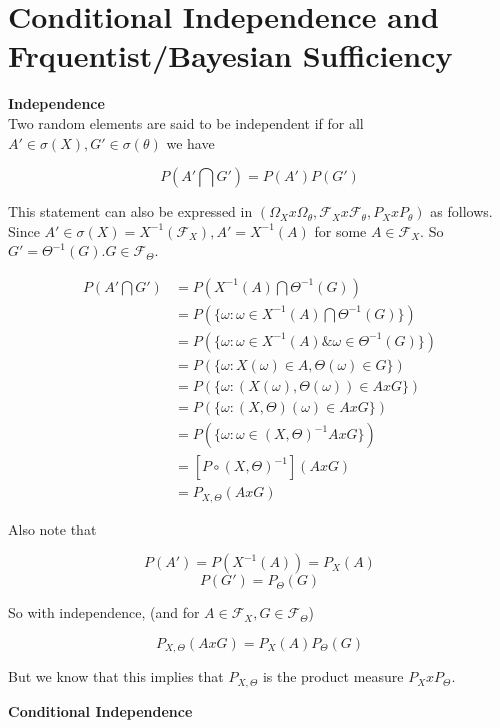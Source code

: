 \documentclass[11pt,fleqn]{book} %
\begin{document}
\section{Conditional Independence and Frquentist/Bayesian Sufficiency}


\textbf{Independence}\\

Two random elements are said to be independent if for all $A' \in \sigma(X), G' \in \sigma(\theta)$ we have

		$$P(A' \bigcap G') = P(A')P(G') $$

This statement can also be expressed in $(\Omega_X x \Omega_\theta, \mathcal{F}_X x \mathcal{F}_\theta, P_X x P_\theta)$ as follows. \\

Since $A' \in \sigma(X) = X^{-1} (\mathcal{F}_X), A' = X^{-1}(A)$ for some $A \in \mathcal{F}_X$. So $G' = \Theta^{-1}(G). G \in \mathcal{F}_\Theta$. 

		\begin{align*}
			P(A' \bigcap G') &= P(X^{-1}(A) \bigcap \Theta^{-1}(G) )\\
				&=P(\{ \omega: \omega \in  X^{-1}(A) \bigcap \Theta^{-1}(G)\} )\\
				&=P(\{ \omega: \omega \in  X^{-1}(A) \& \omega \in \Theta^{-1}(G)\} )\\
				&=P(\{ \omega: X(\omega) \in A, \Theta(\omega) \in G\} )\\
				&=P(\{ \omega:( X(\omega),  \Theta(\omega)) \in A x G\} )\\
				&=P(\{ \omega:( X, \Theta)(\omega) \in A x G\} )\\
				&=P(\{ \omega:\omega \in( X, \Theta)^{-1} A x G\} )\\
				&=[P \circ ( X, \Theta)^{-1} ](A x G)\\
				&=P_{X, \Theta}(A x G)
		\end{align*}

Also note that

		$$P(A') = P(X^{-1}(A)) = P_X(A) $$
		$$P(G') = P_\Theta (G) $$


So with independence, (and for $A \in \mathcal{F}_X, G \in \mathcal{F}_\Theta$)

		$$P_{X, \Theta}(A x G) = P_X (A) P_\Theta(G) $$

But we know that this implies that $P_{X, \Theta}$ is the product measure $P_X x P_\Theta$. 

\textbf{Conditional Independence}\\
\end{document}
